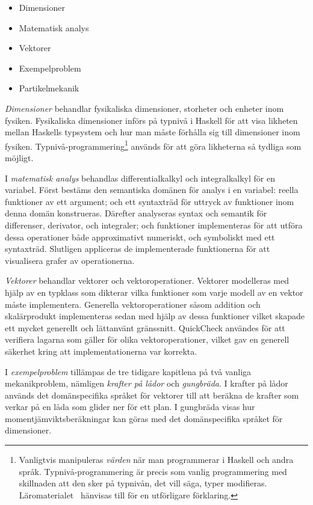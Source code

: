 \begin{itemize}
  \item Dimensioner
  \item Matematisk analys
  \item Vektorer
  \item Exempelproblem
  \item Partikelmekanik
\end{itemize}

\textit{Dimensioner} behandlar fysikaliska dimensioner, storheter och enheter inom fysiken.
Fysikaliska dimensioner införs på typnivå i Haskell för att visa likheten mellan
Haskells typsystem och hur man måste förhålla sig till dimensioner inom fysiken.
Typnivå-programmering\footnote{Vanligtvis manipuleras \textit{värden} när man
programmerar i Haskell och andra språk. Typnivå-programmering är precis som
vanlig programmering med skillnaden att den sker på typnivån, det vill säga,
typer modifieras. Läromaterialet~\cite{LYAP} hänvisas till för en utförligare
förklaring.} används för att göra likheterna så tydliga som möjligt.

I \textit{matematisk analys} behandlas differentialkalkyl och
integralkalkyl för en variabel. Först bestäms den semantiska domänen
för analys i en variabel: reella funktioner av ett argument; och ett syntaxträd
för uttryck av funktioner inom denna domän konstrueras. Därefter
analyseras syntax och semantik för differenser, derivator, och
integraler; och funktioner implementeras för att utföra dessa
operationer både approximativt numeriskt, och symboliskt med ett 
syntaxträd. Slutligen appliceras de implementerade funktionerna för
att visualisera grafer av operationerna.

\textit{Vektorer} behandlar vektorer och vektoroperationer. Vektorer modelleras
med hjälp av en typklass som dikterar vilka funktioner som varje
modell av en vektor måste implementera. Generella vektoroperationer såsom
addition och skalärprodukt implementeras sedan med hjälp av dessa funktioner
vilket skapade ett mycket generellt och lättanvänt gränssnitt. QuickCheck
användes för att verifiera lagarna som gäller för olika vektoroperationer,
vilket gav en generell säkerhet kring att implementationerna var korrekta.

I \textit{exempelproblem} tillämpas de tre tidigare kapitlena på två vanliga mekanikproblem, nämligen \textit{krafter på lådor} och \textit{gungbräda}. I krafter på lådor används det domänspecifika språket för vektorer till att beräkna de krafter som verkar på en låda som glider ner för ett plan. I gungbräda visas hur momentjämviktsberäkningar kan göras med det domänspecifika språket för dimensioner.

